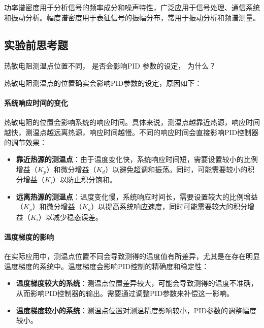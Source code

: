 \documentclass[dvipsnames, svgnames,a4paper,11pt]{article}
\begin{document}
        功率谱密度用于分析信号的频率成分和噪声特性，广泛应用于信号处理、通信系统和振动分析。幅度谱密度用于表征信号的振幅分布，常用于振动分析和频谱测量。







\clearpage

\subsection{实验前思考题}



\begin{question}
	热敏电阻测温点位置不同， 是否会影响PID 参数的设定， 为什么？
\end{question}


热敏电阻测温点的位置确实会影响PID参数的设定，原因如下：

\paragraph*{系统响应时间的变化}

热敏电阻的位置会影响系统的响应时间。具体来说，测温点越靠近热源，响应时间越快，测温点越远离热源，响应时间越慢。不同的响应时间会直接影响PID控制器的调节效果：

\begin{itemize}
    \item \textbf{靠近热源的测温点}：由于温度变化快，系统响应时间短，需要设置较小的比例增益（$K_p$）和微分增益（$K_d$）以避免超调和振荡。同时，可能需要较小的积分增益（$K_i$）以防止积分饱和。
    \item \textbf{远离热源的测温点}：温度变化慢，系统响应时间长，需要设置较大的比例增益（$K_p$）和微分增益（$K_d$）以提高系统响应速度，同时可能需要较大的积分增益（$K_i$）以减少稳态误差。
\end{itemize}

\paragraph*{温度梯度的影响}

在实际应用中，测温点位置不同会导致测得的温度值有所差异，尤其是在存在明显温度梯度的系统中。温度梯度会影响PID控制的精确度和稳定性：

\begin{itemize}
    \item \textbf{温度梯度较大的系统}：测温点位置差异较大，可能会导致测得的温度不准确，从而影响PID控制器的输出。需要通过调整PID参数来补偿这一影响。
    \item \textbf{温度梯度较小的系统}：测温点位置对测温精度影响较小，PID参数的调整幅度较小。
\end{itemize}
\end{document}
